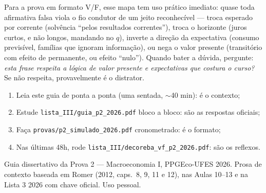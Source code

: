 \documentclass[12pt, a4paper]{article}
\begin{document}
Para a prova em formato V/F, esse mapa tem uso prático imediato: quase toda
afirmativa falsa viola o fio condutor de um jeito reconhecível --- troca
esperado por corrente (solvência ``pelos resultados correntes''), troca o
horizonte (juros curtos, e não longos, mandando no $q$), inverte a direção da
expectativa (consumo previsível, famílias que ignoram informação), ou nega o
valor presente (transitório com efeito de permanente, ou efeito ``nulo'').
Quando bater a dúvida, pergunte: \emph{esta frase respeita a lógica de valor
presente e expectativas que costura o curso?} Se não respeita, provavelmente
é o distrator.

\vspace{1em}
\begin{contextobox}[title={Trilha final de estudo (ordem sugerida)}]
\begin{enumerate}[leftmargin=1.6em, itemsep=0.1em]
\item Leia este guia de ponta a ponta (uma sentada, $\sim$40 min): é o
contexto;
\item Estude \texttt{lista\_III/guia\_p2\_2026.pdf} bloco a bloco: são as
respostas oficiais;
\item Faça \texttt{provas/p2\_simulado\_2026.pdf} cronometrado: é o formato;
\item Nas últimas 48h, rode \texttt{lista\_III/decoreba\_vf\_p2\_2026.pdf}:
são os reflexos.
\end{enumerate}
\end{contextobox}

\vfill
{\small\color{grayrbc} Guia dissertativo da Prova 2 --- Macroeconomia I,
PPGEco-UFES 2026. Prosa de contexto baseada em Romer (2012, caps.\ 8, 9, 11 e
12), nas Aulas 10--13 e na Lista 3 2026 com chave oficial. Uso pessoal.}
\end{document}
